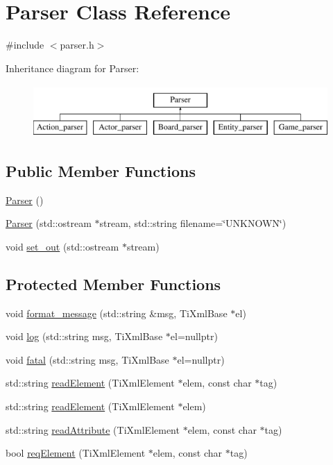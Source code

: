 \hypertarget{class_parser}{\section{Parser Class Reference}
\label{class_parser}
}


{\ttfamily \#include $<$parser.\-h$>$}

Inheritance diagram for Parser\-:\begin{figure}[H]
\begin{center}
\leavevmode
\includegraphics[height=2.000000cm]{class_parser}
\end{center}
\end{figure}
\subsection*{Public Member Functions}
\begin{DoxyCompactItemize}
\item 
\hyperlink{class_parser_a12234f6cd36b61af4b50c94a179422c1}{Parser} ()
\item 
\hyperlink{class_parser_a89acc6fb3df6ab8e057f43d065c1ff50}{Parser} (std\-::ostream $\ast$stream, std\-::string filename=\char`\"{}U\-N\-K\-N\-O\-W\-N\char`\"{})
\item 
void \hyperlink{class_parser_a5bd88cd16274ffe89c0a5ec0678525da}{set\-\_\-out} (std\-::ostream $\ast$stream)
\end{DoxyCompactItemize}
\subsection*{Protected Member Functions}
\begin{DoxyCompactItemize}
\item 
void \hyperlink{class_parser_ae8eeb9f3116dce90f8fd5ab267c5773f}{format\-\_\-message} (std\-::string \&msg, Ti\-Xml\-Base $\ast$el)
\item 
void \hyperlink{class_parser_ae4c1362cb6fe05ba3eb3f1e662654a7c}{log} (std\-::string msg, Ti\-Xml\-Base $\ast$el=nullptr)
\item 
void \hyperlink{class_parser_abc90ea43684459b62e7c6e427a837840}{fatal} (std\-::string msg, Ti\-Xml\-Base $\ast$el=nullptr)
\item 
std\-::string \hyperlink{class_parser_a977153b2f9ff5be8cf436696b18e4c6c}{read\-Element} (Ti\-Xml\-Element $\ast$elem, const char $\ast$tag)
\item 
std\-::string \hyperlink{class_parser_ad6ad607bb6ca701cdaba3dbea8d26ca6}{read\-Element} (Ti\-Xml\-Element $\ast$elem)
\item 
std\-::string \hyperlink{class_parser_ab9e0267aecaf7861b8a239fb72da949b}{read\-Attribute} (Ti\-Xml\-Element $\ast$elem, const char $\ast$tag)
\item 
bool \hyperlink{class_parser_a44cf607802b6863b512ccdbe6c34c9ad}{req\-Element} (Ti\-Xml\-Element $\ast$elem, const char $\ast$tag)
\end{DoxyCompactItemize}
